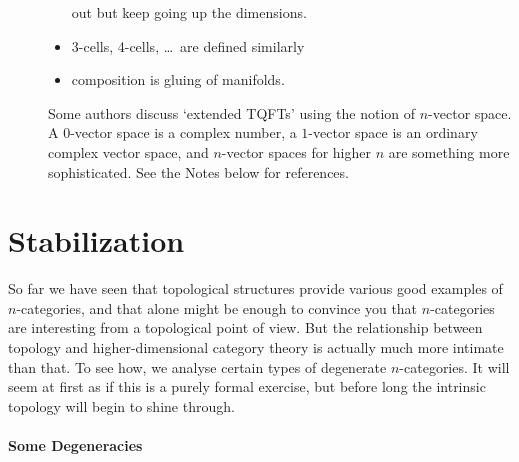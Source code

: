 \begin{description}
\begin{itemize}
out but keep going up the dimensions.
\item 3-cells, 4-cells, \ldots\ are defined similarly
\item composition is gluing of manifolds.
\end{itemize}
%
Some authors discuss `extended TQFTs' using the notion of $n$-vector
space.%
%
%
A $0$-vector space is a complex number, a $1$-vector space is an ordinary
complex vector space, and $n$-vector spaces for higher $n$ are something
more sophisticated.  See the Notes below for references.%
%
%
\end{description}



\section*{Stabilization}
%
%
%

So far we have seen that topological structures provide various good examples
of $n$-categories, and that alone might be enough to convince you that
$n$-categories are interesting from a topological point of view.  But the
relationship between topology and higher-dimensional category theory is
actually much more intimate than that.  To see how, we analyse certain
types of degenerate $n$-categories.  It will seem at first as if this is a
purely formal exercise, but before long the intrinsic topology will begin
to shine through.

\paragraph*{Some Degeneracies}

